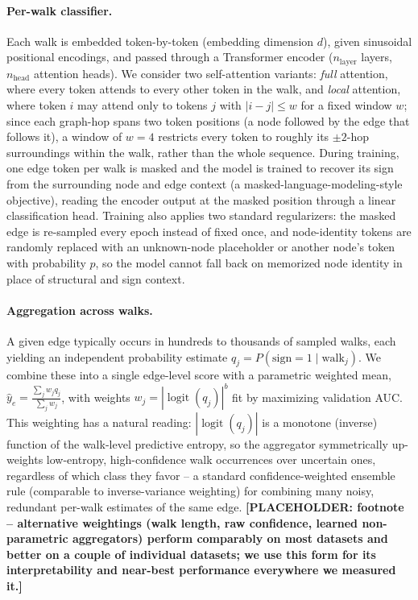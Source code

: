 \documentclass[letterpaper]{article} %
\newcommand{\ph}[1]{\textbf{[#1]}}  %
\theoremstyle{plain}
\theoremstyle{definition}
\begin{document}
\paragraph{Per-walk classifier.} Each walk is embedded token-by-token (embedding dimension $d$), given sinusoidal positional encodings, and passed through a Transformer encoder ($n_\text{layer}$ layers, $n_\text{head}$ attention heads). We consider two self-attention variants: \emph{full} attention, where every token attends to every other token in the walk, and \emph{local} attention, where token $i$ may attend only to tokens $j$ with $|i-j|\le w$ for a fixed window $w$; since each graph-hop spans two token positions (a node followed by the edge that follows it), a window of $w=4$ restricts every token to roughly its $\pm2$-hop surroundings within the walk, rather than the whole sequence. During training, one edge token per walk is masked and the model is trained to recover its sign from the surrounding node and edge context (a masked-language-modeling-style objective), reading the encoder output at the masked position through a linear classification head. Training also applies two standard regularizers: the masked edge is re-sampled every epoch instead of fixed once, and node-identity tokens are randomly replaced with an unknown-node placeholder or another node's token with probability $p$, so the model cannot fall back on memorized node identity in place of structural and sign context.

\paragraph{Aggregation across walks.} A given edge typically occurs in hundreds to thousands of sampled walks, each yielding an independent probability estimate $q_j = P(\text{sign}=1 \mid \text{walk}_j)$. We combine these into a single edge-level score with a parametric weighted mean, $\hat{y}_e = \frac{\sum_j w_j q_j}{\sum_j w_j}$, with weights $w_j = |\operatorname{logit}(q_j)|^{b}$ fit by maximizing validation AUC. This weighting has a natural reading: $|\operatorname{logit}(q_j)|$ is a monotone (inverse) function of the walk-level predictive entropy, so the aggregator symmetrically up-weights low-entropy, high-confidence walk occurrences over uncertain ones, regardless of which class they favor -- a standard confidence-weighted ensemble rule (comparable to inverse-variance weighting) for combining many noisy, redundant per-walk estimates of the same edge. \ph{PLACEHOLDER: footnote -- alternative weightings (walk length, raw confidence, learned non-parametric aggregators) perform comparably on most datasets and better on a couple of individual datasets; we use this form for its interpretability and near-best performance everywhere we measured it.}
\end{document}
